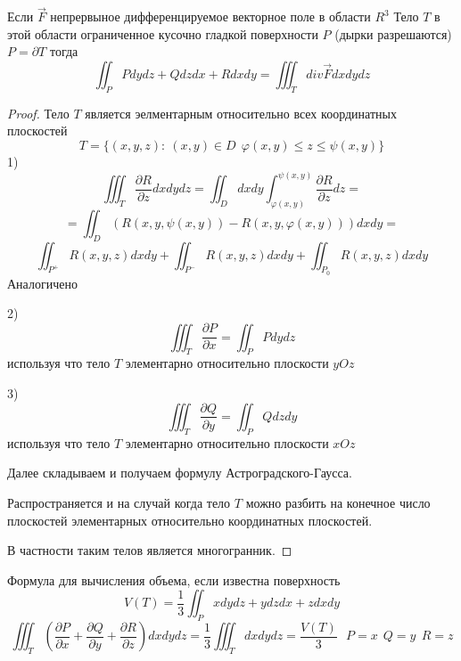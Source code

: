 \begin{theorem}
  Если $\vec F$ непрервыное дифференцируемое векторное поле в области $R^3$
  Тело $T$ в этой области ограниченное кусочно гладкой поверхности $P$
  (дырки разрешаются) $P = \partial T$ тогда
  $$
  \iint_P P dy dz + Q dz dx + R dx dy =
  \iiint_T div \vec F dxdydz
  $$
\end{theorem}

\begin{proof}
  Тело $T$ является эелментарным относительно всех координатных плоскостей
  $$
  T = \{(x, y,z): ~ (x,y) \in D ~~ \varphi(x,y) \le z \le \psi(x,y)\}
  $$
  1)
  $$
  \iiint_T \frac{\partial R}{\partial z} dxdydz = \iint_D dxdy
  \int^{\psi(x,y)}_{\varphi(x,y)} \frac{\partial R}{\partial z} dz =
  $$
  $$
  = \iint_D (R(x,y, \psi(x,y)) - R(x,y, \varphi(x,y))) dx dy =
  $$
  $$
  \iint_{P^+} R(x,y,z) dx dy + \iint_{P^-} R(x,y,z) dxdy + \iint_{P_0}
  R(x,y,z) dxdy
  $$
  Аналогичено

  2)
  $$
  \iiint_T \frac{\partial P}{\partial x} = \iint_P P dydz
  $$
  используя что тело $T$ элементарно относительно плоскости $yOz$

  3)
  $$
  \iiint_T \frac{\partial Q}{\partial y} = \iint_P Q dzdy
  $$
  используя что тело $T$ элементарно относительно плоскости $xOz$

  Далее складываем и получаем формулу Астроградского-Гаусса.

  Распространяется и на случай когда тело $T$ можно разбить на конечное число
  плоскостей элементарных относительно координатных плоскостей.

  В частности таким телов является многогранник.
\end{proof}

\begin{block}[Следствие]
  Формула для вычисления объема, если известна поверхность
  $$
  V(T) = \frac{1}{3} \iint_P xdydz + ydzdx + zdxdy
  $$
  $$
  \iiint_T \left( \frac{\partial P}{\partial x} + \frac{\partial Q}{\partial y}
  + \frac{\partial R}{\partial z} \right) dxdydz = \frac{1}{3} \iiint_T dxdydz =
  \frac{V(T)}{3} ~~~ P = x ~~ Q = y ~~ R = z
  $$
\end{block}
